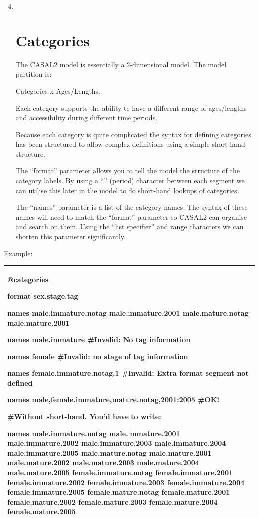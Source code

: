 \documentclass[a4paper,11pt,twoside,pdftex,draft]{article}
\begin{document}
\begin{enumerate}
\setcounter{enumi}{3}
\item ~
  \hypertarget{categories}{%
  \section{Categories}\label{categories}}

  The CASAL2 model is essentially a 2-dimensional model. The model
  partition is:

  Categories x Ages/Lengths.

  Each category supports the ability to have a different range of
  ages/lengths and accessibility during different time periods.

  Because each category is quite complicated the syntax for defining
  categories has been structured to allow complex definitions using a
  simple short-hand structure.

  The ``format'' parameter allows you to tell the model the structure of
  the category labels. By using a ``.'' (period) character between each
  segment we can utilise this later in the model to do short-hand
  lookups of categories.

  The ``names'' parameter is a list of the category names. The syntax of
  these names will need to match the ``format'' parameter so CASAL2 can
  organise and search on them. Using the ``list specifier'' and range
  characters we can shorten this parameter significantly.
\end{enumerate}

Example:

\begin{longtable}[]{@{}l@{}}
\toprule
\endhead
\begin{minipage}[t]{0.97\columnwidth}\raggedright
@categories

format sex.stage.tag

names male.immature.notag male.immature.2001 male.mature.notag
male.mature.2001

names male.immature \#Invalid: No tag information

names female \#Invalid: no stage of tag information

names female.immature.notag.1 \#Invalid: Extra format segment not
defined

names male,female.immature,mature.notag,2001:2005 \#OK!

\#Without short-hand. You'd have to write:

names male.immature.notag male.immature.2001 male.immature.2002
male.immature.2003 male.immature.2004 male.immature.2005
male.mature.notag male.mature.2001 male.mature.2002 male.mature.2003
male.mature.2004 male.mature.2005 female.immature.notag
female.immature.2001 female.immature.2002 female.immature.2003
female.immature.2004 female.immature.2005 female.mature.notag
female.mature.2001 female.mature.2002 female.mature.2003
female.mature.2004 female.mature.2005\strut
\end{minipage}\tabularnewline
\bottomrule
\end{longtable}
\end{document}
